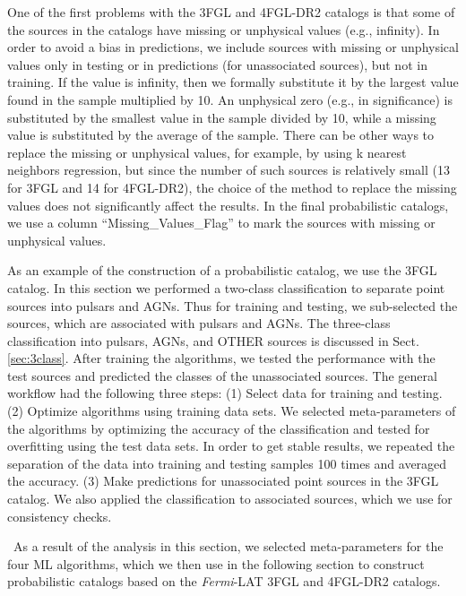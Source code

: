 \documentclass[referee]{aa} %
\newcommand{\Fermi}{\textit{Fermi}\xspace}
\begin{document}
One of the first problems with the 3FGL and 4FGL-DR2 catalogs is that
some of the sources in the catalogs have missing or unphysical values (e.g., infinity).
In order to avoid a bias in predictions, we include sources with missing or unphysical values only in testing or in predictions (for unassociated sources), but not in training.
If the value is infinity, then we formally substitute it by the largest value found in the sample multiplied by 10.
An unphysical zero (e.g., in significance) is substituted by the smallest value in the sample divided by 10,
while a missing value is substituted by the average of the sample.
There can be other ways to replace the missing or unphysical values, for example, by using k nearest neighbors regression, 
but since the number of such sources is relatively small (13 for 3FGL and 14 for 4FGL-DR2), 
the choice of the method to replace the missing values does not significantly affect the results.
In the final probabilistic catalogs, we use a column ``Missing\_Values\_Flag'' to mark 
the sources with missing or unphysical values.

As an example of the construction of a probabilistic catalog, we use the 3FGL catalog.
In this section we performed a two-class classification to separate point sources into pulsars and AGNs.
Thus for training and testing, we sub-selected the sources, which are associated with pulsars and AGNs.
The three-class classification into pulsars, AGNs, and OTHER sources is discussed in Sect. \ref{sec:3class}.
After training the algorithms, we tested the performance with the test sources and predicted the classes of the unassociated sources.
The general workflow had the following three steps: (1) Select data for training and testing. (2) Optimize algorithms using training data sets.
We selected meta-parameters of the algorithms by optimizing the accuracy of the classification and tested for overfitting using the test data sets.
In order to get stable results, we repeated the separation of the data into training and testing samples 100 times and 
averaged the accuracy. (3)
Make predictions for unassociated point sources in the 3FGL catalog.
We also applied the classification to associated sources, which we use for consistency checks.

\
As a result of the analysis in this section, we selected meta-parameters for the four ML algorithms,
which we then use in the following section to construct probabilistic catalogs
based on the \Fermi-LAT 3FGL and 4FGL-DR2 catalogs.
\end{document}
